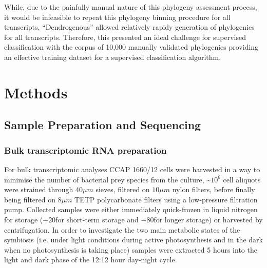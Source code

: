 While, due to the painfully manual nature of this phylogeny assessment process, 
it would be infeasible to repeat this phylogeny binning procedure for all transcripts, ``Dendrogenous'' allowed
relatively rapidy generation of phylogenies for all transcripts.  Therefore, this presented an ideal
challenge for supervised classification with the corpus of 10,000 manually validated phylogenies providing an effective
training dataset for a supervised classification algorithm.  








%
%
\section{Methods} 

\subsection{Sample Preparation and Sequencing}

\subsubsection{Bulk transcriptomic RNA preparation}
For bulk transcriptomic analyses CCAP 1660/12 cells were harvested in a way to minimise the 
number of bacterial prey species from the culture, \textasciitilde \(10^{6}\) 
cell aliquots were strained through \(40\mu m\) sieves, filtered on 
\(10 \mu m\) nylon filters, 
before finally being filtered on \(8 \mu m\) TETP polycarbonate filters using a 
low-pressure filtration pump.  Collected samples were either immediately 
quick-frozen in liquid nitrogen for storage (\(-20\)\celsius for short-term storage 
and \(-80\)\celsius for longer storage) or harvested by centrifugation.  
In order to investigate the two main metabolic states of the symbiosis 
(i.e. under light conditions during active photosynthesis and in the dark 
when no photosynthesis is taking place) samples were extracted 5 hours into 
the light and dark phase of the 12:12 hour day-night cycle.

